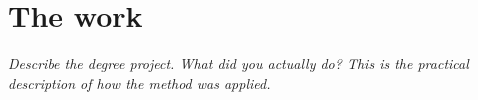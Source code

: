 \chapter{The work}

\emph{Describe the degree project. What did you actually do? This is the practical description of how the method was applied.}

\lipsum[3-6]
